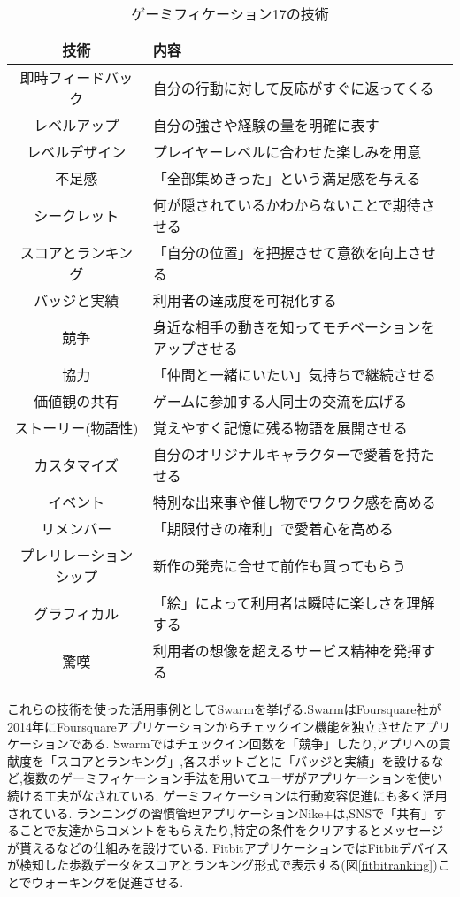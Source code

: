 \begin{table}[htbp]
	\begin{center}
		\caption{ゲーミフィケーション17の技術}
		\label{gamification17table}
		\begin{tabular}{|c|l|}
		\hline
		技術 & 内容\\
		\hline \hline
		即時フィードバック & 自分の行動に対して反応がすぐに返ってくる\\
		レベルアップ & 自分の強さや経験の量を明確に表す\\
		レベルデザイン & プレイヤーレベルに合わせた楽しみを用意\\
		不足感 & 「全部集めきった」という満足感を与える \\
		シークレット & 何が隠されているかわからないことで期待させる\\
		スコアとランキング &「自分の位置」を把握させて意欲を向上させる\\
		バッジと実績 & 利用者の達成度を可視化する\\
		競争 & 身近な相手の動きを知ってモチベーションをアップさせる\\
		協力 &「仲間と一緒にいたい」気持ちで継続させる\\
		価値観の共有 & ゲームに参加する人同士の交流を広げる\\
		ストーリー(物語性) & 覚えやすく記憶に残る物語を展開させる\\
		カスタマイズ & 自分のオリジナルキャラクターで愛着を持たせる\\
		イベント & 特別な出来事や催し物でワクワク感を高める\\
		リメンバー & 「期限付きの権利」で愛着心を高める\\
		プレリレーションシップ & 新作の発売に合せて前作も買ってもらう\\
		グラフィカル & 「絵」によって利用者は瞬時に楽しさを理解する\\
		驚嘆 & 利用者の想像を超えるサービス精神を発揮する\\
		\hline
		\end{tabular}
	\end{center}
\end{table}

これらの技術を使った活用事例としてSwarm\cite{Swarm}を挙げる.SwarmはFoursquare社が2014年にFoursquare\cite{Foursquare}アプリケーションからチェックイン機能を独立させたアプリケーションである.
Swarmではチェックイン回数を「競争」したり,アプリへの貢献度を「スコアとランキング」,各スポットごとに「バッジと実績」を設けるなど,複数のゲーミフィケーション手法を用いてユーザがアプリケーションを使い続ける工夫がなされている.
ゲーミフィケーションは行動変容促進にも多く活用されている.
ランニングの習慣管理アプリケーションNike+\cite{Nikeplus}は,SNSで「共有」することで友達からコメントをもらえたり,特定の条件をクリアするとメッセージが貰えるなどの仕組みを設けている.
FitbitアプリケーションではFitbitデバイス\cite{Fitbit}が検知した歩数データをスコアとランキング形式で表示する(図\ref{fitbitranking})ことでウォーキングを促進させる.

